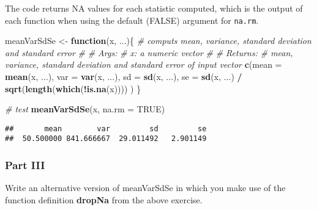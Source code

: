 \documentclass[12,]{article}
\newenvironment{Shaded}{\begin{snugshade}}{\end{snugshade}}
\newcommand{\KeywordTok}[1]{\textcolor[rgb]{0.13,0.29,0.53}{\textbf{#1}}}
\newcommand{\DataTypeTok}[1]{\textcolor[rgb]{0.13,0.29,0.53}{#1}}
\newcommand{\StringTok}[1]{\textcolor[rgb]{0.31,0.60,0.02}{#1}}
\newcommand{\CommentTok}[1]{\textcolor[rgb]{0.56,0.35,0.01}{\textit{#1}}}
\newcommand{\OtherTok}[1]{\textcolor[rgb]{0.56,0.35,0.01}{#1}}
\newcommand{\ControlFlowTok}[1]{\textcolor[rgb]{0.13,0.29,0.53}{\textbf{#1}}}
\newcommand{\OperatorTok}[1]{\textcolor[rgb]{0.81,0.36,0.00}{\textbf{#1}}}
\newcommand{\NormalTok}[1]{#1}
\begin{document}
The code returns NA values for each statistic computed, which is the
output of each function when using the default (FALSE) argument for
\texttt{na.rm}.

\begin{Shaded}
\begin{Highlighting}[]
\NormalTok{meanVarSdSe <-}\StringTok{ }\ControlFlowTok{function}\NormalTok{(x, ...)\{}
  \CommentTok{# computs mean, variance, standard deviation and standard error}
  \CommentTok{#}
  \CommentTok{# Args:}
  \CommentTok{#   x: a numeric vector}
  \CommentTok{#}
  \CommentTok{# Returns:}
  \CommentTok{#   mean, variance, standard deviation and standard error of input vector}
  \KeywordTok{c}\NormalTok{(}\DataTypeTok{mean =} \KeywordTok{mean}\NormalTok{(x, ...),}
    \DataTypeTok{var =} \KeywordTok{var}\NormalTok{(x, ...),}
    \DataTypeTok{sd =} \KeywordTok{sd}\NormalTok{(x, ...),}
    \DataTypeTok{se =} \KeywordTok{sd}\NormalTok{(x, ...) }\OperatorTok{/}\StringTok{ }\KeywordTok{sqrt}\NormalTok{(}\KeywordTok{length}\NormalTok{(}\KeywordTok{which}\NormalTok{(}\OperatorTok{!}\KeywordTok{is.na}\NormalTok{(x))))}
\NormalTok{  )}
\NormalTok{\}}

\CommentTok{# test}
\KeywordTok{meanVarSdSe}\NormalTok{(x, }\DataTypeTok{na.rm =} \OtherTok{TRUE}\NormalTok{)}
\end{Highlighting}
\end{Shaded}

\begin{verbatim}
##       mean        var         sd         se 
##  50.500000 841.666667  29.011492   2.901149
\end{verbatim}

\subsubsection*{Part III}\label{part-iii}

Write an alternative version of meanVarSdSe in which you make use of the
function definition \textbf{dropNa} from the above exercise.
\end{document}
